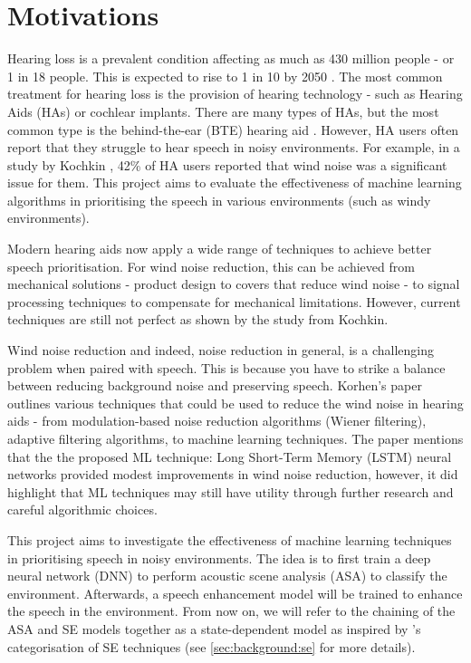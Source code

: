 \documentclass[logo,bsc,singlespacing,parskip,online]{infthesis}
\begin{document}
\section{Motivations}
Hearing loss is a prevalent condition affecting as much as 
430 million people - or 1 in 18 people. This is expected 
to rise to 1 in 10 by 2050 \cite{WHO2024deafness}.
The most common treatment for hearing loss is the 
provision of hearing technology - such as Hearing Aids (HAs) or cochlear implants.
There are many types of HAs, but the most common
type is the behind-the-ear (BTE) hearing aid \cite{Kochkin2010MarkeTrak8}.
However, HA users often report that they struggle to hear speech
in noisy environments. For example, in a study by Kochkin \cite{Kochkin2010MarkeTrak8},
42\% of HA users reported that wind noise was a significant issue for them.
This project aims to evaluate the effectiveness of machine learning algorithms
in prioritising the speech in various environments (such as windy environments).

Modern hearing aids now apply a wide range of techniques to achieve 
better speech prioritisation. For wind noise reduction, this can be achieved 
from mechanical solutions - product design to covers that reduce wind noise - to 
signal processing techniques to compensate for mechanical limitations.
However, current techniques are still not perfect as shown by the study from Kochkin.

Wind noise reduction and indeed, noise reduction in general, is a challenging problem
when paired with speech. This is because you have 
to strike a balance between reducing background noise and
preserving speech. 
Korhen's paper \cite{Korhonen2021WindNoise} outlines 
various techniques that could be used to reduce the wind noise in hearing aids -
from modulation-based noise reduction algorithms (Wiener filtering),
adaptive filtering algorithms, to machine learning techniques.
The paper mentions that the the proposed ML technique:
Long Short-Term Memory (LSTM) neural networks provided
modest improvements in wind noise reduction, however, it did highlight
that ML techniques may still have utility through further research 
and careful algorithmic choices. 

This project aims to investigate the effectiveness of machine learning techniques 
in prioritising speech in noisy environments. The idea is to 
first train a deep neural network (DNN) to perform acoustic scene analysis (ASA) to classify the environment.
Afterwards, a speech enhancement model will be trained to enhance the speech in the environment.
From now on, we will refer to the chaining of the ASA and SE models together as a state-dependent model
as inspired by \citet{katagiri_handbook_2000}'s categorisation of SE techniques (see \ref{sec:background:se} for more details).
\end{document}
